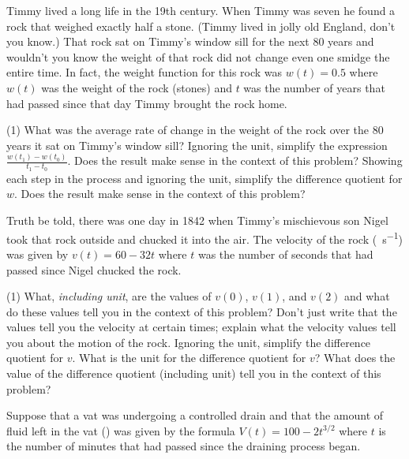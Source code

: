 \documentclass[10pt,oneside,]{book}
\theoremstyle{plain}
\theoremstyle{definition}
\numberwithin{equation}{section}
\newcommand{\fe}[2]{#1\mathopen{}\left(#2\right)\mathclose{}}
\begin{document}
Timmy lived a long life in the 19th century. When Timmy was seven he found a rock that weighed exactly half a stone. (Timmy lived in jolly old England, don't you know.) That rock sat on Timmy's window sill for the next 80 years and wouldn't you know the weight of that rock did not change even one smidge the entire time. In fact, the weight function for this rock was \(\fe{w}{t}=0.5\) where \(\fe{w}{t}\) was the weight of the rock (stones) and \(t\) was the number of years that had passed since that day Timmy brought the rock home.%
\par
\begin{exercisegroup}(1)
\exercise[12.]\hypertarget{exercise-20}{\null}What was the average rate of change in the weight of the rock over the 80 years it sat on Timmy's window sill?%
\exercise[13.]\hypertarget{exercise-21}{\null}Ignoring the unit, simplify the expression \(\frac{\fe{w}{t_1}-\fe{w}{t_0}}{t_1-t_0}\). Does the result make sense in the context of this problem?%
\exercise[14.]\hypertarget{exercise-22}{\null}Showing each step in the process and ignoring the unit, simplify the difference quotient for \(w\). Does the result make sense in the context of this problem?%
\end{exercisegroup}
\par\smallskip\noindent
Truth be told, there was one day in 1842 when Timmy's mischievous son Nigel took that rock outside and chucked it into the air. The velocity of the rock (\si{\foot\per\second}) was given by \(\fe{v}{t}=60-32t\) where \(t\) was the number of seconds that had passed since Nigel chucked the rock.%
\par
\begin{exercisegroup}(1)
\exercise[15.]\hypertarget{exercise-23}{\null}What, \emph{including unit}, are the values of \(\fe{v}{0}\), \(\fe{v}{1}\), and \(\fe{v}{2}\) and what do these values tell you in the context of this problem? Don't just write that the values tell you the velocity at certain times; explain what the velocity values tell you about the motion of the rock.%
\exercise[16.]\hypertarget{exercise-24}{\null}Ignoring the unit, simplify the difference quotient for \(v\).%
\exercise[17.]\hypertarget{exercise-25}{\null}What is the unit for the difference quotient for \(v\)? What does the value of the difference quotient (including unit) tell you in the context of this problem?%
\end{exercisegroup}
\par\smallskip\noindent
Suppose that a vat was undergoing a controlled drain and that the amount of fluid left in the vat (\si{\gallon}) was given by the formula \(\fe{V}{t}=100-2t^{3/2}\) where \(t\) is the number of minutes that had passed since the draining process began.%
\end{document}
